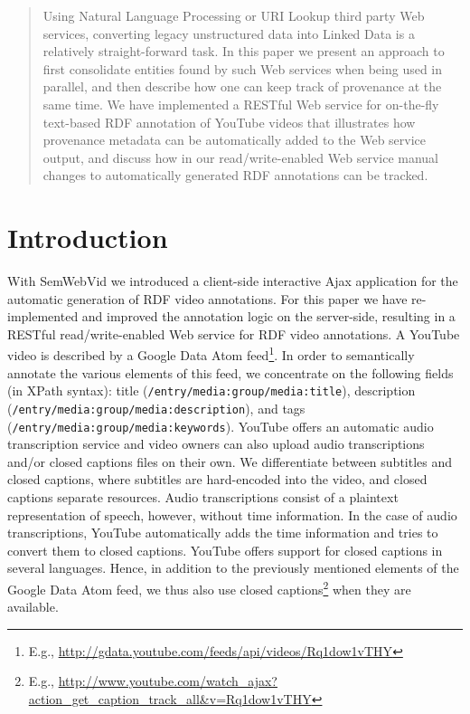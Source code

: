 \documentclass{acm_proc_article-sp}
\begin{document}
\maketitle
\begin{abstract}
Using Natural Language Processing or URI Lookup third party Web services, converting legacy unstructured data into Linked Data is a relatively straight-forward task. In this paper we present an approach to first consolidate entities found by such Web services when being used in parallel, and then describe how one can keep track of provenance at the same time. We have implemented a RESTful Web service for on-the-fly text-based RDF annotation of YouTube videos that illustrates how provenance metadata can be automatically added to the Web service output, and discuss how in our read/write-enabled Web service manual changes to automatically generated RDF annotations can be tracked. 
\end{abstract}




\section{Introduction}\label{sec:introduction}
With SemWebVid \cite{Steiner:SemWebVid} we introduced a client-side interactive Ajax application for the automatic generation of RDF video annotations. For this paper we have re-implemented and improved the annotation logic on the server-side, resulting in a RESTful read/write-enabled Web service for RDF video annotations. A YouTube video is described by a Google Data Atom feed\footnote{E.g., \url{http://gdata.youtube.com/feeds/api/videos/Rq1dow1vTHY}}. In order to semantically annotate the various elements of this feed, we concentrate on the following fields (in XPath syntax): title (\texttt{/entry/media:group/media:title}), description (\texttt{/entry/media:group/media:description}), and tags (\texttt{/entry/media:group/media:keywords}). YouTube offers an automatic audio transcription service and video owners can also upload audio transcriptions and/or closed captions files on their own. We differentiate between subtitles and closed captions, where subtitles are hard-encoded into the video, and closed captions separate resources. Audio transcriptions consist of a plaintext representation of speech, however, without time information. In the case of audio transcriptions, YouTube automatically adds the time information and tries to convert them to closed captions. YouTube offers support for closed captions in several languages. Hence, in addition to the previously mentioned elements of the Google Data Atom feed, we thus also use closed captions\footnote{E.g., \url{http://www.youtube.com/watch_ajax?action_get_caption_track_all&v=Rq1dow1vTHY}} when they are available.
\end{document}
